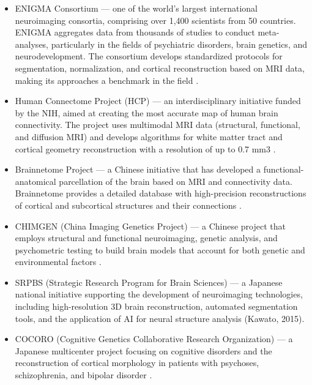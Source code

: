 \documentclass[default]{subfiles}
\begin{document}
\begin{itemize}
    \item ENIGMA Consortium — one of the world’s largest international neuroimaging consortia, comprising over 1,400
    scientists from 50 countries. ENIGMA aggregates data from thousands of studies to conduct meta-analyses,
    particularly in the fields of psychiatric disorders, brain genetics, and neurodevelopment. The consortium develops
    standardized protocols for segmentation, normalization, and cortical reconstruction based on MRI data, making its
    approaches a benchmark in the field \cite{hellard_2014}.

    \item Human Connectome Project (HCP) — an interdisciplinary initiative funded by the NIH, aimed at creating the
    most accurate map of human brain connectivity. The project uses multimodal MRI data (structural, functional, and
    diffusion MRI) and develops algorithms for white matter tract and cortical geometry reconstruction with a
    resolution of up to 0.7 mm3 \cite{van_2013}.
    
    \item Brainnetome Project — a Chinese initiative that has developed a functional-anatomical parcellation of the
    brain based on MRI and connectivity data. Brainnetome provides a detailed database with high-precision
    reconstructions of cortical and subcortical structures and their connections \cite{jiang_2013, hohnson_2016}.
    
    \item CHIMGEN (China Imaging Genetics Project) — a Chinese project that employs structural and functional
    neuroimaging, genetic analysis, and psychometric testing to build brain models that account for both genetic and
    environmental factors \cite{xu_2020}.
    
    \item SRPBS (Strategic Research Program for Brain Sciences) — a Japanese national initiative supporting the
    development of neuroimaging technologies, including high-resolution 3D brain reconstruction, automated segmentation
    tools, and the application of AI for neural structure analysis (Kawato, 2015).
    
    \item COCORO (Cognitive Genetics Collaborative Research Organization) — a Japanese multicenter project focusing on
    cognitive disorders and the reconstruction of cortical morphology in patients with psychoses, schizophrenia, and
    bipolar disorder \cite{koshiyama_2022}.\newline
\end{itemize}
\end{document}
